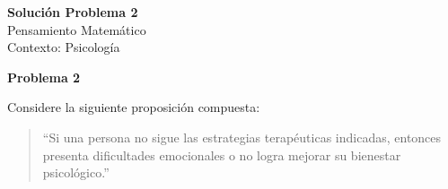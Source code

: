 \documentclass[12pt]{article}
\begin{document}
	
	\begin{center}
		{\Large \textbf{Solución Problema 2}}\\[0.3cm]
		{\normalsize Pensamiento Matemático}\\[0.2cm]
		{\normalsize Contexto: Psicología}
	\end{center}
	
	\vspace{0.4cm}
	
	\noindent
	\textbf{Problema 2}
	
	\vspace{0.2cm}
	
	Considere la siguiente proposición compuesta:
	
	\begin{quote}
		``Si una persona no sigue las estrategias terapéuticas indicadas, entonces presenta dificultades emocionales o no logra mejorar su bienestar psicológico.''
	\end{quote}
	
\end{document}
